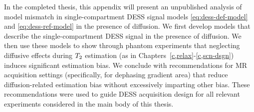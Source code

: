 
In the completed thesis,
this appendix will present
an unpublished analysis
of model mismatch 
in single-compartment DESS signal models 
\eqref{eq:dess-def-model} and \eqref{eq:dess-ref-model}
in the presence of diffusion.
We first develop models
that describe the single-compartment DESS signal 
in the presence of diffusion.
We then use these models
to show through phantom experiments
that neglecting diffusive effects
during $T_2$ estimation
(as in Chapters~\ref{c,relax}-\ref{c,scn-dsgn})
induces significant estimation bias.
We conclude with recommendations
for MR acquisition settings
(specifically, for dephasing gradient area)
that reduce diffusion-related estimation bias
without excessively imparting other bias.
These recommendations were used 
to guide DESS acquisition design
for all relevant experiments
considered in the main body of this thesis.
